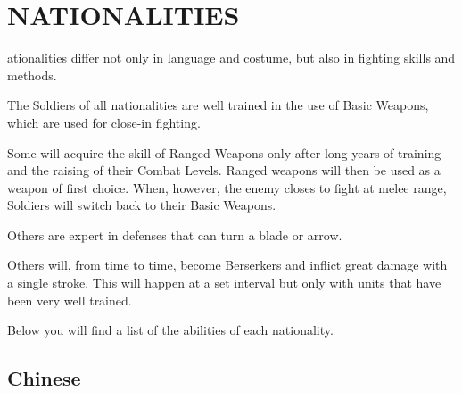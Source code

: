 
\chapter{\textsf{NATIONALITIES}}

ationalities differ not only in language and costume, but also in fighting skills and methods.


The Soldiers of all nationalities are well trained in the use of Basic Weapons, which are used for close-in fighting.

Some will acquire the skill of Ranged Weapons only after long years of training and the raising of their Combat Levels. Ranged weapons will then be used as a weapon of first choice. When, however, the enemy closes to fight at melee range, Soldiers will switch back to their Basic Weapons.

Others are expert in defenses that can turn a blade or arrow.

Others will, from time to time, become Berserkers and inflict great damage with a single stroke. This will happen at a set interval but only with units that have been very well trained.

Below you will find a list of the abilities of each nationality.

\clearpage %

\section{\textsf{Chinese}}


